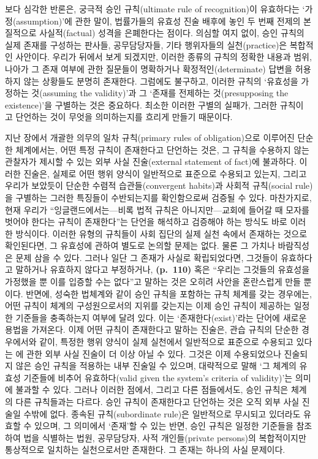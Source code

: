 보다 심각한 반론은, 궁극적 승인 규칙(ultimate rule of recognition)이
유효하다는 ‘가정(assumption)’에 관한 말이, 법률가들의 유효성 진술 배후에
놓인 두 번째 전제의 본질적으로 사실적(factual) 성격을 은폐한다는 점이다.
의심할 여지 없이, 승인 규칙의 실제 존재를 구성하는 판사들, 공무담당자들,
기타 행위자들의 실천(practice)은 복합적인 사안이다. 우리가 뒤에서 보게
되겠지만, 이러한 종류의 규칙의 정확한 내용과 범위, 나아가 그 존재 여부에
관한 질문들이 명확하거나 확정적인(determinate) 답변을 허용하지 않는
상황들도 분명히 존재한다. 그럼에도 불구하고, 이러한 규칙의 ‘유효성을
가정하는 것(assuming the validity)’과 그 ‘존재를 전제하는
것(presupposing the existence)’을 구별하는 것은 중요하다. 최소한 이러한
구별의 실패가, 그러한 규칙이 고 단언하는 것이
무엇을 의미하는지를 흐리게 만들기 때문이다.

지난 장에서 개괄한 의무의 일차 규칙(primary rules of obligation)으로
이루어진 단순한 체계에서는, 어떤 특정 규칙이 존재한다고 단언하는 것은,
그 규칙을 수용하지 않는 관찰자가 제시할 수 있는 외부 사실 진술(external
statement of fact)에 불과하다. 이러한 진술은, 실제로 어떤 행위 양식이
일반적으로 표준으로 수용되고 있는지, 그리고 우리가 보았듯이 단순한
수렴적 습관들(convergent habits)과 사회적 규칙(social rule)을 구별하는
그러한 특징들이 수반되는지를 확인함으로써 검증될 수 있다. 마찬가지로,
현재 우리가 “잉글랜드에서는---비록 법적 규칙은 아니지만---교회에 들어갈
때 모자를 벗어야 한다는 규칙이 존재한다”는 단언을 해석하고 검증해야
하는 방식도 바로 이러한 방식이다. 이러한 유형의 규칙들이 사회 집단의
실제 실천 속에서 존재하는 것으로 확인된다면, 그 유효성에 관하여 별도로
논의할 문제는 없다. 물론 그 가치나 바람직성은 문제 삼을 수 있다. 그러나
일단 그 존재가 사실로 확립되었다면, 그것들이 유효하다고 말하거나
유효하지 않다고 부정하거나, \textbf{(p.~110)} 혹은 “우리는 그것들의
유효성을 가정했을 뿐 이를 입증할 수는 없다”고 말하는 것은 오히려 사안을
혼란스럽게 만들 뿐이다. 반면에, 성숙한 법체계와 같이 승인 규칙을
포함하는 규칙 체계를 갖는 경우에는, 어떤 규칙이 체계의 구성원으로서의
지위를 갖는지는 이제 승인 규칙이 제공하는 일정한 기준들을 충족하는지
여부에 달려 있다. 이는 ‘존재한다(exist)’라는 단어에 새로운 용법을
가져온다. 이제 어떤 규칙이 존재한다고 말하는 진술은, 관습 규칙의 단순한
경우에서와 같이, 특정한 행위 양식이 실제 실천에서 일반적으로 표준으로
수용되고 있다는 에 관한 외부 사실 진술이 더 이상 아닐
수 있다. 그것은 이제 수용되었으나 진술되지 않은 승인 규칙을 적용하는
내부 진술일 수 있으며, 대략적으로 말해 ‘그 체계의 유효성 기준들에 비추어
유효하다(valid given the system’s criteria of validity)'는 의미에 불과할
수 있다. 그러나 이러한 점에서, 그리고 다른 점들에서도, 승인 규칙은
체계의 다른 규칙들과는 다르다. 승인 규칙이 존재한다고 단언하는 것은 오직
외부 사실 진술일 수밖에 없다. 종속된 규칙(subordinate rule)은 일반적으로
무시되고 있더라도 유효할 수 있으며, 그 의미에서 ‘존재’할 수 있는 반면,
승인 규칙은 일정한 기준들을 참조하여 법을 식별하는 법원, 공무담당자,
사적 개인들(private persons)의 복합적이지만 통상적으로 일치하는
실천으로서만 존재한다. 그 존재는 하나의 사실 문제이다.

